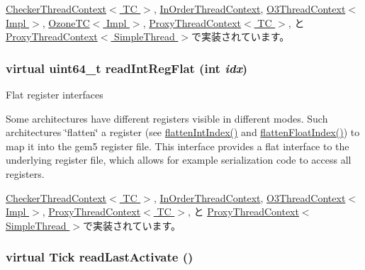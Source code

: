 \hyperlink{classCheckerThreadContext_a21c850cd41ab977a2cf3450fe66ec25a}{CheckerThreadContext$<$ TC $>$}, \hyperlink{classInOrderThreadContext_a21c850cd41ab977a2cf3450fe66ec25a}{InOrderThreadContext}, \hyperlink{classO3ThreadContext_ad1e79749db6bf8c1a5037d798563cd9e}{O3ThreadContext$<$ Impl $>$}, \hyperlink{classOzoneCPU_1_1OzoneTC_a21c850cd41ab977a2cf3450fe66ec25a}{OzoneTC$<$ Impl $>$}, \hyperlink{classProxyThreadContext_a21c850cd41ab977a2cf3450fe66ec25a}{ProxyThreadContext$<$ TC $>$}, と \hyperlink{classProxyThreadContext_a21c850cd41ab977a2cf3450fe66ec25a}{ProxyThreadContext$<$ SimpleThread $>$}で実装されています。\hypertarget{classThreadContext_aebc14d23082a9095e0f641a6c5c8b083}{
\subsubsection[{readIntRegFlat}]{\setlength{\rightskip}{0pt plus 5cm}virtual uint64\_\-t readIntRegFlat (int {\em idx})}}
\label{classThreadContext_aebc14d23082a9095e0f641a6c5c8b083}
Flat register interfaces

Some architectures have different registers visible in different modes. Such architectures \char`\"{}flatten\char`\"{} a register (see \hyperlink{classThreadContext_a6940c379416884cb0b9eb04c5193580e}{flattenIntIndex()} and \hyperlink{classThreadContext_a7176627444d21b2734a0855b67e6aacf}{flattenFloatIndex()}) to map it into the gem5 register file. This interface provides a flat interface to the underlying register file, which allows for example serialization code to access all registers. 

\hyperlink{classCheckerThreadContext_aed7abd4afcb954f8612e4ef1fe73317a}{CheckerThreadContext$<$ TC $>$}, \hyperlink{classInOrderThreadContext_aed7abd4afcb954f8612e4ef1fe73317a}{InOrderThreadContext}, \hyperlink{classO3ThreadContext_aed7abd4afcb954f8612e4ef1fe73317a}{O3ThreadContext$<$ Impl $>$}, \hyperlink{classProxyThreadContext_aed7abd4afcb954f8612e4ef1fe73317a}{ProxyThreadContext$<$ TC $>$}, と \hyperlink{classProxyThreadContext_aed7abd4afcb954f8612e4ef1fe73317a}{ProxyThreadContext$<$ SimpleThread $>$}で実装されています。\hypertarget{classThreadContext_a99574c7f076a26875232079962cbe522}{
\subsubsection[{readLastActivate}]{\setlength{\rightskip}{0pt plus 5cm}virtual {\bf Tick} readLastActivate ()}}
\label{classThreadContext_a99574c7f076a26875232079962cbe522}


